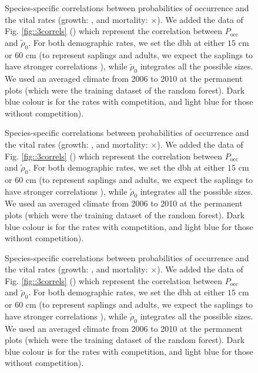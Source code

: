 \documentclass[letterpaper, 12pt]{article}
\theoremstyle{theo}
\begin{document}
\begin{refsection}
\begin{onehalfspace}
\begin{figure}
	\centering
	
	\caption[$ P_{\text{occ}} $ vs vital rates, species 5-8]{Species-specific correlations between probabilities of occurrence and the vital rates (growth: \CircSteel, and mortality: $ \times $). We added the data of Fig. \ref{fig::3correls} (\MoveUp) which represent the correlation between $ P_{\text{occ}} $ and $ \tilde \rho_0 $. For both demographic rates, we set the dbh at either $ 15 $ cm or $ 60 $ cm (to represent saplings and adults, we expect the saplings to have stronger correlations \citep{Kunstler2019}), while $ \tilde \rho_0 $ integrates all the possible sizes. We used an averaged climate from 2006 to 2010 at the permanent plots (which were the training dataset of the random forest). Dark blue colour is for the rates with competition, and light blue for those without competition). \label{fig::demog_Pocc5-8}}
\end{figure}

\begin{figure}
	\centering
	
	\caption[$ P_{\text{occ}} $ vs vital rates, species 9-12]{Species-specific correlations between probabilities of occurrence and the vital rates (growth: \CircSteel, and mortality: $ \times $). We added the data of Fig. \ref{fig::3correls} (\MoveUp) which represent the correlation between $ P_{\text{occ}} $ and $ \tilde \rho_0 $. For both demographic rates, we set the dbh at either $ 15 $ cm or $ 60 $ cm (to represent saplings and adults, we expect the saplings to have stronger correlations \citep{Kunstler2019}), while $ \tilde \rho_0 $ integrates all the possible sizes. We used an averaged climate from 2006 to 2010 at the permanent plots (which were the training dataset of the random forest). Dark blue colour is for the rates with competition, and light blue for those without competition). \label{fig::demog_Pocc9-12}}
\end{figure}

\begin{figure}
	\centering
	
	\caption[$ P_{\text{occ}} $ vs vital rates, species 13-14]{Species-specific correlations between probabilities of occurrence and the vital rates (growth: \CircSteel, and mortality: $ \times $). We added the data of Fig. \ref{fig::3correls} (\MoveUp) which represent the correlation between $ P_{\text{occ}} $ and $ \tilde \rho_0 $. For both demographic rates, we set the dbh at either $ 15 $ cm or $ 60 $ cm (to represent saplings and adults, we expect the saplings to have stronger correlations \citep{Kunstler2019}), while $ \tilde \rho_0 $ integrates all the possible sizes. We used an averaged climate from 2006 to 2010 at the permanent plots (which were the training dataset of the random forest). Dark blue colour is for the rates with competition, and light blue for those without competition). \label{fig::demog_Pocc13-14}}
\end{figure}

\end{onehalfspace}

\clearpage
\printbibliography[heading=subbibliography]
\end{refsection}
\end{document}
